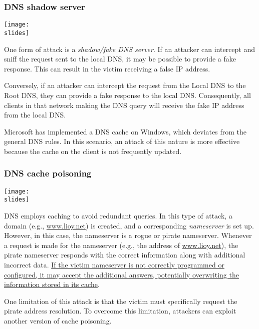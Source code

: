\subsubsection{DNS shadow server}

\noindent
\begin{minipage}{0.4\textwidth}
    \centering
    \texttt{[image: \\slides]}
\end{minipage}
\hspace{0.05\textwidth}
\begin{minipage}{0.5\textwidth}
    One form of attack is a \textit{shadow/fake DNS server}.
    If an attacker can intercept and sniff the request sent to the local DNS, it may be possible to provide a fake response. This can result in the victim receiving a false IP address.

    Conversely, if an attacker can intercept the request from the Local DNS to the Root DNS, they can provide a fake response to the local DNS. Consequently, all clients in that network making the DNS query will receive the fake IP address from the local DNS.

    Microsoft has implemented a DNS cache on Windows, which deviates from the general DNS rules. In this scenario, an attack of this nature is more effective because the cache on the client is not frequently updated.
\end{minipage}



\subsubsection{DNS cache poisoning}
\noindent
\begin{minipage}{0.4\textwidth}
    \centering
    \texttt{[image: \\slides]}
\end{minipage}
\hspace{0.05\textwidth}
\begin{minipage}{0.5\textwidth}
    DNS employs caching to avoid redundant queries. In this type of attack, a domain (e.g., \underline{www.lioy.net}) is created, and a corresponding \textit{nameserver} is set up.
    However, in this case, the nameserver is a rogue or pirate nameserver. Whenever a request is made for the nameserver (e.g., the address of \underline{www.lioy.net}), the pirate nameserver responds with the correct information along with additional incorrect data. \ul{If the victim nameserver is not correctly programmed or configured, it may accept the additional answers, potentially overwriting the information stored in its cache}.

    One limitation of this attack is that the victim must specifically request the pirate address resolution. To overcome this limitation, attackers can exploit another version of cache poisoning.
\end{minipage}


